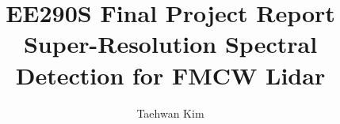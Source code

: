 \documentclass[11pt,journal, onecolumn]{IEEEtran}
\theoremstyle{theorem}
\begin{document}
%
\title{
    \large{EE290S Final Project Report}\\
    \huge{Super-Resolution Spectral Detection for FMCW Lidar}
}



\author[]{Taehwan Kim}

% 
\end{document}
